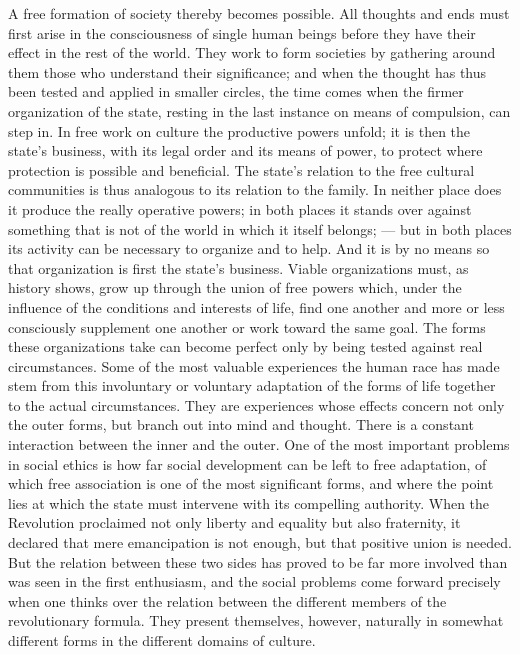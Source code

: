 \documentclass[12pt,a4paper,openany]{book}
\newcommand{\opage}[1]{\marginnote{\footnotesize\textit{[#1]}}}
\begin{document}
A free formation of society thereby becomes possible. All thoughts and ends must first arise in the consciousness of
single human beings before they have their effect in the rest of the world. They work to form societies by gathering
around them those who understand their significance; and when the thought has thus been tested and applied in smaller
circles, the time comes when the firmer organization of the state, resting in the last instance on means of compulsion,
can step in. In free work on culture the productive powers unfold; it is then the state's business, with its legal order
and its means of power, to protect where protection is possible and beneficial. The state's relation to the free cultural
communities is thus analogous to its relation to the family. In neither place does it produce the really operative
powers; in both places it stands over against something that is not of the world in which it itself belongs; --- but in
both places its activity can be necessary to organize and to help. And it is by no means so that organization is first
the state's business. Viable organizations must, as history shows, grow up through the union of free powers which, under
the influence of the conditions and interests of life, find one another and more or less consciously supplement one
another or work toward the same goal. The forms these organizations take can become perfect only by being tested against
real circumstances. Some of the most valuable experiences the human race has made stem from this involuntary or voluntary
adaptation of the forms of life together to the actual
\opage{356}circumstances. They are experiences whose effects concern not only the outer forms, but branch out into mind
and thought. There is a constant interaction between the inner and the outer. One of the most important problems in
social ethics is how far social development can be left to free adaptation, of which free association is one of the most
significant forms, and where the point lies at which the state must intervene with its compelling authority. When the
Revolution proclaimed not only liberty and equality but also fraternity, it declared that mere emancipation is not
enough, but that positive union is needed. But the relation between these two sides has proved to be far more involved
than was seen in the first enthusiasm, and the social problems come forward precisely when one thinks over the relation
between the different members of the revolutionary formula. They present themselves, however, naturally in somewhat
different forms in the different domains of culture.
\end{document}
